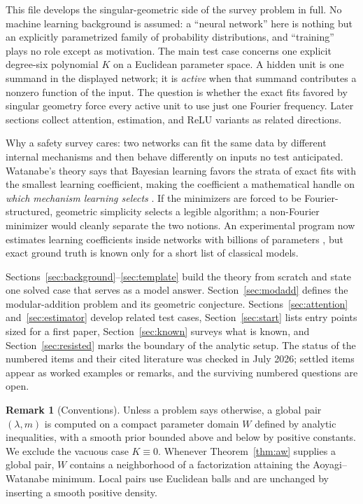 \documentclass[11pt]{amsart}
\theoremstyle{plain}
\theoremstyle{definition}
\newtheorem{remark}[theorem]{Remark}
\begin{document}
This file develops the singular-geometric side of the survey problem in full. No machine learning background is assumed: a ``neural network'' here is nothing but an explicitly parametrized family of probability distributions, and ``training'' plays no role except as motivation. The main test case concerns one explicit degree-six polynomial $K$ on a Euclidean parameter space. A hidden unit is one summand in the displayed network; it is \emph{active} when that summand contributes a nonzero function of the input. The question is whether the exact fits favored by singular geometry force every active unit to use just one Fourier frequency. Later sections collect attention, estimation, and ReLU variants as related directions.

Why a safety survey cares: two networks can fit the same data by different internal mechanisms and then behave differently on inputs no test anticipated. Watanabe's theory says that Bayesian learning favors the strata of exact fits with the smallest learning coefficient, making the coefficient a mathematical handle on \emph{which mechanism learning selects} \cite{lehalleur2025}. If the minimizers are forced to be Fourier-structured, geometric simplicity selects a legible algorithm; a non-Fourier minimizer would cleanly separate the two notions. An experimental program now estimates learning coefficients inside networks with billions of parameters \cite{lau2023, murfet2026}, but exact ground truth is known only for a short list of classical models.

Sections~\ref{sec:background}--\ref{sec:template} build the theory from scratch and state one solved case that serves as a model answer. Section~\ref{sec:modadd} defines the modular-addition problem and its geometric conjecture. Sections~\ref{sec:attention} and~\ref{sec:estimator} develop related test cases, Section~\ref{sec:start} lists entry points sized for a first paper, Section~\ref{sec:known} surveys what is known, and Section~\ref{sec:resisted} marks the boundary of the analytic setup. The status of the numbered items and their cited literature was checked in July 2026; settled items appear as worked examples or remarks, and the surviving numbered questions are open.

\begin{remark}[Conventions]\label{rem:conventions}
Unless a problem says otherwise, a global pair $(\lambda,m)$ is computed on a compact parameter domain $W$ defined by analytic inequalities, with a smooth prior bounded above and below by positive constants. We exclude the vacuous case $K\equiv0$. Whenever Theorem~\ref{thm:aw} supplies a global pair, $W$ contains a neighborhood of a factorization attaining the Aoyagi--Watanabe minimum. Local pairs use Euclidean balls and are unchanged by inserting a smooth positive density.
\end{remark}
\end{document}
